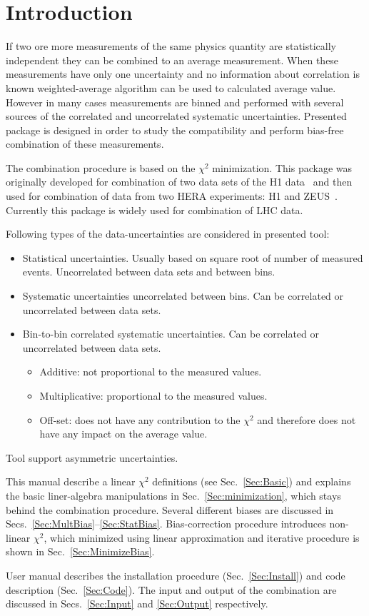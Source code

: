 \section{Introduction}

If two ore more measurements of the same physics quantity are statistically independent they can be combined to an average measurement. When these measurements have only one uncertainty and no information about correlation is known weighted-average algorithm can be used to calculated average value. However in many cases measurements are binned and performed with several sources of the correlated and uncorrelated systematic uncertainties. Presented package is designed in order to study the compatibility and perform bias-free combination of these measurements.

The combination procedure is based on the $\chi^2$ minimization. This package was originally developed for combination of two data sets of the H1 data~\cite{H1Comb} and then used for combination of data from two HERA experiments: H1 and ZEUS~\cite{HERAComb}. Currently this package is widely used for combination of LHC data.

Following types of the data-uncertainties are considered in presented tool:
\begin{itemize}
\item Statistical uncertainties. Usually based on square root of number of measured events. Uncorrelated between data sets and between bins.
\item Systematic uncertainties uncorrelated between bins. Can be correlated or uncorrelated between data sets.
\item Bin-to-bin correlated systematic uncertainties. Can be correlated or uncorrelated between data sets.
\begin{itemize}
\item Additive: not proportional to the measured values.
\item Multiplicative: proportional to the measured values.
\item Off-set: does not have any contribution to the $\chi^2$ and therefore does not have any impact on the average value.
\end{itemize}
\end{itemize}
Tool support asymmetric uncertainties.
 
This manual describe a linear $\chi^2$ definitions (see Sec.~\ref{Sec:Basic}) and explains the basic liner-algebra manipulations in Sec.~\ref{Sec:minimization}, which stays behind the combination procedure. Several different biases are discussed in Secs.~\ref{Sec:MultBias}--\ref{Sec:StatBias}. Bias-correction procedure introduces non-linear $\chi^2$, which minimized using linear approximation and iterative procedure is shown in Sec.~\ref{Sec:MinimizeBias}.

User manual describes the installation procedure (Sec.~\ref{Sec:Install}) and code description (Sec.~\ref{Sec:Code}). The input and output of the combination are discussed in Secs.~\ref{Sec:Input} and \ref{Sec:Output} respectively.